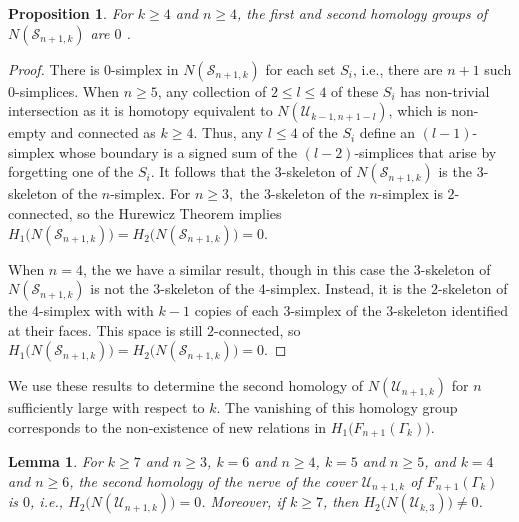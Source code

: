 \documentclass[pagebackref,colorlinks,citecolor=blue,linkcolor=blue,urlcolor=blue,filecolor=blue]{article}
\newtheorem{lem}[thm]{Lemma}
\newtheorem{prop}[thm]{Proposition}
\theoremstyle{definition}\newtheorem{definition}[thm]{Definition}
\theoremstyle{definition}
\begin{document}
\begin{prop}\label{nerve is a ball}
For $k\ge 4$ and $n\ge 4$, the first and second homology groups of $N(\mathcal{S}_{n+1, k})$ are $0$ .
\end{prop}

\begin{proof}
There is $0$-simplex in $N(\mathcal{S}_{n+1, k})$ for each set $S_{i}$, i.e., there are $n+1$ such $0$-simplices.
When $n\ge 5$, any collection of $2\le l\le 4$ of these $S_{i}$ has non-trivial intersection as it is homotopy equivalent to $N(\mathcal{U}_{k-1, n+1-l})$, which is non-empty and connected as $k\ge 4$.
Thus, any $l\le 4$ of the $S_{i}$ define an $(l-1)$-simplex whose boundary is a signed sum of the $(l-2)$-simplices that arise by forgetting one of the $S_{i}$.
It follows that the $3$-skeleton of $N(\mathcal{S}_{n+1, k})$ is the $3$-skeleton of the $n$-simplex.
For $n\ge3,$ the $3$-skeleton of the $n$-simplex is $2$-connected, so the Hurewicz Theorem implies $H_{1}\big(N(\mathcal{S}_{n+1, k})\big)=H_{2}\big(N(\mathcal{S}_{n+1, k})\big)=0$.

When $n=4$, the we have a similar result, though in this case the $3$-skeleton of $N(\mathcal{S}_{n+1, k})$ is not the $3$-skeleton of the $4$-simplex. 
Instead, it is the $2$-skeleton of the $4$-simplex with with $k-1$ copies of each $3$-simplex of the $3$-skeleton identified at their faces.
This space is still $2$-connected, so $H_{1}\big(N(\mathcal{S}_{n+1, k})\big)=H_{2}\big(N(\mathcal{S}_{n+1, k})\big)=0$.
\end{proof}

We use these results to determine the second homology of $N(\mathcal{U}_{n+1, k})$ for $n$ sufficiently large with respect to $k$.
The vanishing of this homology group corresponds to the non-existence of new relations in $H_{1}\big(F_{n+1}(\Gamma_{k})\big)$.

\begin{lem}\label{second homology of nerve}
For $k\ge 7$ and $n\ge 3$, $k=6$ and $n\ge 4$, $k=5$ and $n\ge 5$, and $k=4$ and $n\ge 6$, the second homology of the nerve of the cover $\mathcal{U}_{n+1, k}$ of $F_{n+1}(\Gamma_{k})$ is $0$, i.e., $H_{2}\big(N(\mathcal{U}_{n+1, k})\big)=0$.
Moreover, if $k\ge 7$, then $H_{2}\big(N(\mathcal{U}_{k, 3})\big)\neq 0$.
\end{lem}
\end{document}
